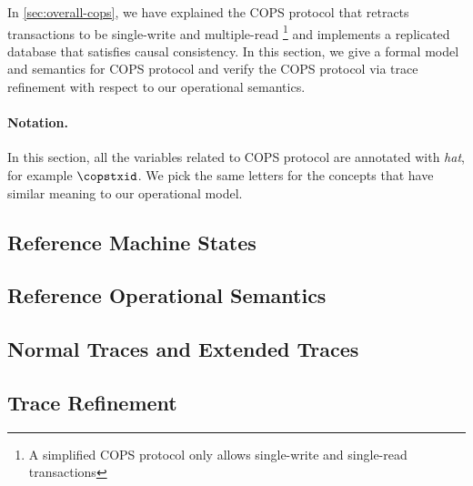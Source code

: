 In \cref{sec:overall-cops}, we have explained the COPS protocol 
that retracts transactions to be single-write and multiple-read%
\footnote{A simplified COPS protocol only allows single-write and single-read transactions}
and implements a replicated database that satisfies causal consistency.
In this section, we give a formal model and semantics for COPS protocol
and verify the COPS protocol via trace refinement with respect to our operational semantics.

\paragraph{Notation.}
In this section, all the variables related to COPS protocol are annotated with \emph{hat}, 
for example \( \copstxid \).
We pick the same letters for the concepts that have similar meaning to our operational model.

\subsection{Reference Machine States} \label{sec:cops-model}  
\subsection{Reference Operational Semantics} \label{sec:cops-semantics}  
\subsection{Normal Traces and Extended Traces} \label{sec:cops-normal-trace}  
\label{sec:cops-extended-trace}  
\subsection{Trace Refinement} \label{sec:cops-encode}  
